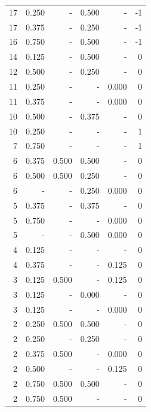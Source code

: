 \documentclass[a4paper]{article}\usepackage{graphicx, color}
\begin{document}
\begin{table}[ht]
\begin{tabular}{rrrrrr}
   \rowcolor{sosoColor} 17 & 0.250 & - & 0.500 & - & -1 \\ 
   \rowcolor{sosoColor} 17 & 0.375 & - & 0.250 & - & -1 \\ 
   \rowcolor{sosoColor} 16 & 0.750 & - & 0.500 & - & -1 \\ 
   \rowcolor{sosoColor} 14 & 0.125 & - & 0.500 & - & 0 \\ 
   \rowcolor{sosoColor} 12 & 0.500 & - & 0.250 & - & 0 \\ 
   \rowcolor{nullColor} 11 & 0.250 & - & - & 0.000 & 0 \\ 
   \rowcolor{nullColor} 11 & 0.375 & - & - & 0.000 & 0 \\ 
   \rowcolor{sosoColor} 10 & 0.500 & - & 0.375 & - & 0 \\ 
   \rowcolor{nullColor} 10 & 0.250 & - & - & - & 1 \\ 
   \rowcolor{nullColor} 7 & 0.750 & - & - & - & 1 \\ 
   \rowcolor{goodColor} 6 & 0.375 & 0.500 & 0.500 & - & 0 \\ 
   \rowcolor{badColor} 6 & 0.500 & 0.500 & 0.250 & - & 0 \\ 
   \rowcolor{sosoColor} 6 & - & - & 0.250 & 0.000 & 0 \\ 
   \rowcolor{sosoColor} 5 & 0.375 & - & 0.375 & - & 0 \\ 
   \rowcolor{nullColor} 5 & 0.750 & - & - & 0.000 & 0 \\ 
   \rowcolor{sosoColor} 5 & - & - & 0.500 & 0.000 & 0 \\ 
   \rowcolor{nullColor} 4 & 0.125 & - & - & - & 0 \\ 
   \rowcolor{nullColor} 4 & 0.375 & - & - & 0.125 & 0 \\ 
  3 & 0.125 & 0.500 & - & 0.125 & 0 \\ 
   \rowcolor{sosoColor} 3 & 0.125 & - & 0.000 & - & 0 \\ 
   \rowcolor{nullColor} 3 & 0.125 & - & - & 0.000 & 0 \\ 
   \rowcolor{goodColor} 2 & 0.250 & 0.500 & 0.500 & - & 0 \\ 
   \rowcolor{sosoColor} 2 & 0.250 & - & 0.250 & - & 0 \\ 
  2 & 0.375 & 0.500 & - & 0.000 & 0 \\ 
   \rowcolor{nullColor} 2 & 0.500 & - & - & 0.125 & 0 \\ 
   \rowcolor{goodColor} 2 & 0.750 & 0.500 & 0.500 & - & 0 \\ 
  2 & 0.750 & 0.500 & - & - & 0 \\ 

\end{tabular}
\end{table}
\end{document}
